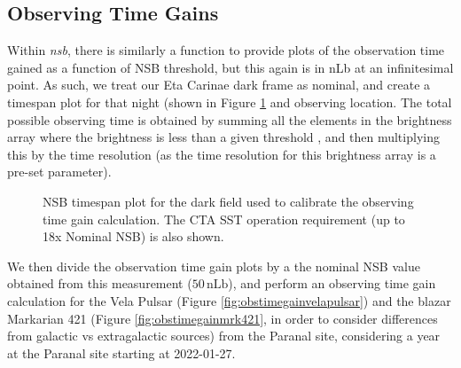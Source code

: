 \subsection{Observing Time Gains}
Within \textit{nsb}, there is similarly a function to provide plots of the observation time gained as a function of NSB threshold, but this again is in nLb at an infinitesimal point. As such, we treat our Eta Carinae dark frame as nominal, and create a timespan plot for that night (shown in Figure \ref{fig:timespan_dark} and observing location. The total possible observing time is obtained by summing all the elements in the brightness array where the brightness is less than a given threshold , and then multiplying this by the time resolution (as the time resolution for this brightness array is a pre-set parameter).
\begin{figure}[ht]
\begin{centering}
\caption{NSB timespan plot for the dark field used to calibrate the observing time gain calculation. The CTA SST operation requirement (up to 18x Nominal NSB) is also shown.}
\label{fig:timespan_dark}
\end{centering}
\end{figure}

We then divide the observation time gain plots by a the nominal NSB value obtained from this measurement ($\mathrm{50\,nLb}$), and perform an observing time gain calculation for the Vela Pulsar (Figure \ref{fig:obstimegainvelapulsar}) and the blazar Markarian 421 (Figure \ref{fig:obstimegainmrk421}, in order to consider differences from galactic vs extragalactic sources) from the Paranal site, considering a year at the Paranal site starting at 2022-01-27.


